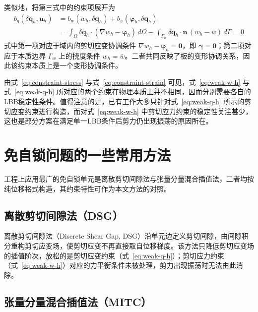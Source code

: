 \documentclass[internationalmaster]{hquThesis}
\begin{document}
类似地，将第三式中的约束项展开为
\begin{equation}
    \begin{aligned}
        b_q(\delta\boldsymbol q_h,\boldsymbol u_h) &= b_w(w_h,\delta\boldsymbol q_h)+b_\varphi(\boldsymbol\varphi_h,\delta\boldsymbol q_h)\\
        &=\int_\Omega \delta\boldsymbol q_h\cdot(\nabla w_h-\boldsymbol\varphi_h)\,d\Omega
        -\int_{\Gamma_w}\delta\boldsymbol q_h\cdot\boldsymbol n\,(w_h-\bar{w})\,d\Gamma=0
    \end{aligned}
    \label{eq:constraint-strain}
\end{equation}
式中第一项对应于域内的剪切应变协调条件 $\nabla w_h-\boldsymbol\varphi_h=\boldsymbol 0$，即 $\boldsymbol\gamma=\boldsymbol 0$；第二项对应于本质边界 $\Gamma_w$ 上的挠度条件 $w_h=\bar{w}$。二者共同反映了板的变形协调关系，因此该约束本质上是一个变形协调条件。

由式~\eqref{eq:constraint-stress} 与式~\eqref{eq:constraint-strain} 可见，式~\eqref{eq:weak-w-h} 与式~\eqref{eq:weak-q-h} 所对应的两个约束在物理本质上并不相同，因而分别需要各自的LBB稳定性条件。值得注意的是，已有工作大多只针对式~\eqref{eq:weak-q-h} 所示的剪切应变约束进行构造，而对式~\eqref{eq:weak-w-h} 中剪切应力约束的稳定性关注甚少，这也是部分方案在满足单一LBB条件后剪力仍出现振荡的原因所在。

\section{免自锁问题的一些常用方法}

工程上应用最广的免自锁单元是离散剪切间隙法与张量分量混合插值法，二者均按纯位移格式构造，其约束特性可作为本文方法的对照。

\subsection{离散剪切间隙法（DSG）}

离散剪切间隙法（Discrete Shear Gap, DSG）沿单元边定义剪切间隙，由间隙积分重构剪切应变场，使剪切应变不再直接取自位移梯度\cite{bletzinger2000}。该方法只降低剪切应变场的插值阶次，放松的是剪切应变约束（式~\eqref{eq:weak-q-h}）；剪切应力约束（式~\eqref{eq:weak-w-h}）对应的力平衡条件未被处理，剪力出现振荡时无法由此消除。

\subsection{张量分量混合插值法（MITC）}
\end{document}
